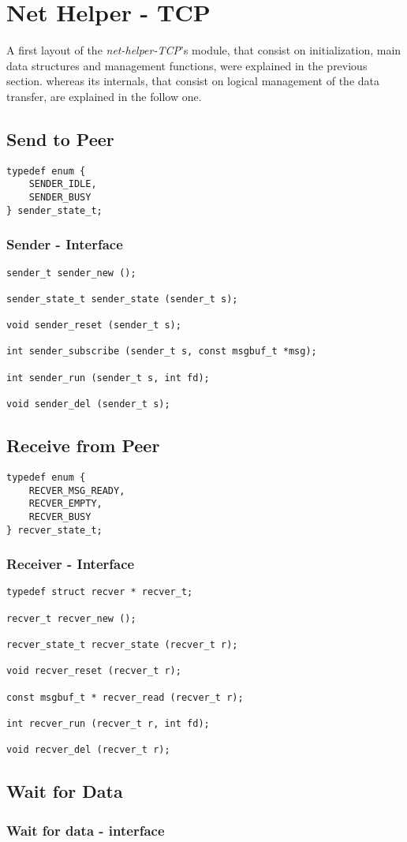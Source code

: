 \section{Net Helper - TCP}
A first layout of the \textit{net-helper-TCP}'s module, that consist on initialization, main data structures
and management functions, were explained in the previous section. whereas its internals, that consist on
logical management of the data transfer, are explained in the follow one.

\subsection{Send to Peer}

\begin{lstlisting}
typedef enum {
    SENDER_IDLE,
    SENDER_BUSY
} sender_state_t;
\end{lstlisting}

\subsubsection{Sender - Interface}

\begin{lstlisting}
sender_t sender_new ();

sender_state_t sender_state (sender_t s);

void sender_reset (sender_t s);

int sender_subscribe (sender_t s, const msgbuf_t *msg);

int sender_run (sender_t s, int fd);

void sender_del (sender_t s);
\end{lstlisting}

\subsection{Receive from Peer}
\begin{lstlisting}
typedef enum {
    RECVER_MSG_READY,
    RECVER_EMPTY,
    RECVER_BUSY
} recver_state_t;
\end{lstlisting}

\subsubsection{Receiver - Interface}
\begin{lstlisting}
typedef struct recver * recver_t;

recver_t recver_new ();

recver_state_t recver_state (recver_t r);

void recver_reset (recver_t r);

const msgbuf_t * recver_read (recver_t r);

int recver_run (recver_t r, int fd);

void recver_del (recver_t r);
\end{lstlisting}

\subsection{Wait for Data}

\subsubsection{Wait for data - interface}
\begin{lstlisting}
\end{lstlisting}
